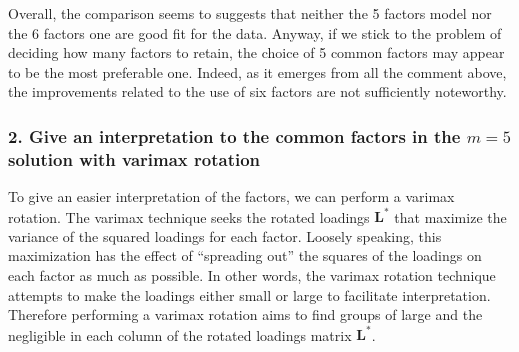 \documentclass[
  letterpaper,
  DIV=11,
  numbers=noendperiod]{scrartcl}
\newenvironment{Shaded}{\begin{snugshade}}{\end{snugshade}}
\newcommand{\AttributeTok}[1]{\textcolor[rgb]{0.40,0.45,0.13}{#1}}
\newcommand{\DecValTok}[1]{\textcolor[rgb]{0.68,0.00,0.00}{#1}}
\newcommand{\FloatTok}[1]{\textcolor[rgb]{0.68,0.00,0.00}{#1}}
\newcommand{\FunctionTok}[1]{\textcolor[rgb]{0.28,0.35,0.67}{#1}}
\newcommand{\NormalTok}[1]{\textcolor[rgb]{0.00,0.23,0.31}{#1}}
\newcommand{\OtherTok}[1]{\textcolor[rgb]{0.00,0.23,0.31}{#1}}
\newcommand{\SpecialCharTok}[1]{\textcolor[rgb]{0.37,0.37,0.37}{#1}}
\newcommand{\StringTok}[1]{\textcolor[rgb]{0.13,0.47,0.30}{#1}}
\begin{document}
Overall, the comparison seems to suggests that neither the 5 factors
model nor the 6 factors one are good fit for the data. Anyway, if we
stick to the problem of deciding how many factors to retain, the choice
of 5 common factors may appear to be the most preferable one. Indeed, as
it emerges from all the comment above, the improvements related to the
use of six factors are not sufficiently noteworthy.

\hypertarget{give-an-interpretation-to-the-common-factors-in-the-m-5-solution-with-varimax-rotation}{%
\subsubsection{\texorpdfstring{2. Give an interpretation to the common
factors in the \(m = 5\) solution with varimax
rotation}{2. Give an interpretation to the common factors in the m = 5 solution with varimax rotation}}\label{give-an-interpretation-to-the-common-factors-in-the-m-5-solution-with-varimax-rotation}}

To give an easier interpretation of the factors, we can perform a
varimax rotation. The varimax technique seeks the rotated loadings
\(\mathbf{L}^*\) that maximize the variance of the squared loadings for
each factor. Loosely speaking, this maximization has the effect of
``spreading out'' the squares of the loadings on each factor as much as
possible. In other words, the varimax rotation technique attempts to
make the loadings either small or large to facilitate interpretation.
Therefore performing a varimax rotation aims to find groups of large and
the negligible in each column of the rotated loadings matrix
\(\mathbf{L}^*\).

\begin{Shaded}
\end{Shaded}
\end{document}
